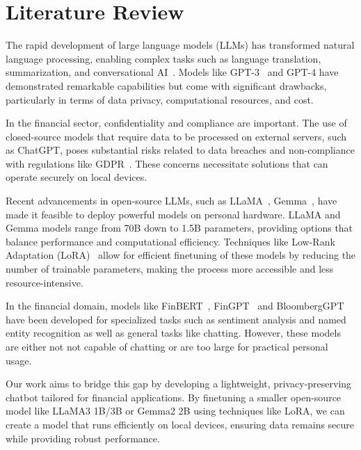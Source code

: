 \documentclass[11pt, a4paper]{article}
\begin{document}
\section{Literature Review}

The rapid development of large language models (LLMs) has transformed natural language processing, enabling complex tasks such as language translation, summarization, and conversational AI~\cite{devlin2018bert, brown2020language}. Models like GPT-3~\cite{brown2020language} and GPT-4 have demonstrated remarkable capabilities but come with significant drawbacks, particularly in terms of data privacy, computational resources, and cost.

In the financial sector, confidentiality and compliance are important. The use of closed-source models that require data to be processed on external servers, such as ChatGPT, poses substantial risks related to data breaches and non-compliance with regulations like GDPR~\cite{voigt2017eu}. These concerns necessitate solutions that can operate securely on local devices.

Recent advancements in open-source LLMs, such as LLaMA~\cite{touvron2023llama, touvron2023llama2, llama3}, Gemma~\cite{gemma2}, have made it feasible to deploy powerful models on personal hardware. LLaMA and Gemma models range from 70B down to 1.5B parameters, providing options that balance performance and computational efficiency. Techniques like Low-Rank Adaptation (LoRA)~\cite{hu2021lora} allow for efficient finetuning of these models by reducing the number of trainable parameters, making the process more accessible and less resource-intensive.

In the financial domain, models like FinBERT~\cite{araci2019finbert}, FinGPT~\cite{fingpt} and BloombergGPT~\cite{bloomberggpt} have been developed for specialized tasks such as sentiment analysis and named entity recognition as well as general tasks like chatting. However, these models are either not not capable of chatting or are too large for practical personal usage.

Our work aims to bridge this gap by developing a lightweight, privacy-preserving chatbot tailored for financial applications. By finetuning a smaller open-source model like LLaMA3 1B/3B or Gemma2 2B using techniques like LoRA, we can create a model that runs efficiently on local devices, ensuring data remains secure while providing robust performance.
\end{document}
